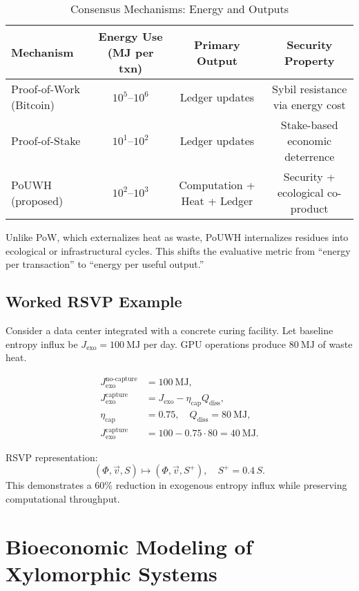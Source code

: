 \documentclass[12pt]{article}
\theoremstyle{plain}
\begin{document}
{{{{{{{{{{{{{{{{\begin{table}[h]
\centering
\caption{Consensus Mechanisms: Energy and Outputs}
\label{tab:consensus-compare}
\begin{tabular}{lccc}
\toprule
Mechanism & Energy Use (MJ per txn) & Primary Output & Security Property \\
\midrule
Proof-of-Work (Bitcoin) & $10^5$--$10^6$ & Ledger updates & Sybil resistance via energy cost \\
Proof-of-Stake & $10^1$--$10^2$ & Ledger updates & Stake-based economic deterrence \\
PoUWH (proposed) & $10^2$--$10^3$ & Computation + Heat + Ledger & Security + ecological co-product \\
\bottomrule
\end{tabular}
\end{table}

Unlike PoW, which externalizes heat as waste, PoUWH internalizes residues into ecological or infrastructural cycles. This shifts the evaluative metric from ``energy per transaction'' to ``energy per useful output.''

\subsection{Worked RSVP Example}
\label{sec:rsvp-example}

Consider a data center integrated with a concrete curing facility. Let baseline entropy influx be $J_{\text{exo}} = \SI{100}{\mega\joule}$ per day. GPU operations produce $\SI{80}{\mega\joule}$ of waste heat.

\begin{align*}
J_{\text{exo}}^{\text{no-capture}} &= \SI{100}{\mega\joule}, \\
J_{\text{exo}}^{\text{capture}} &= J_{\text{exo}} - \eta_{\text{cap}} Q_{\text{diss}}, \\
\eta_{\text{cap}} &= 0.75, \quad Q_{\text{diss}} = \SI{80}{\mega\joule}, \\
J_{\text{exo}}^{\text{capture}} &= 100 - 0.75 \cdot 80 = \SI{40}{\mega\joule}.
\end{align*}

RSVP representation:
\[
(\Phi, \vec v, S) \mapsto (\Phi, \vec v, S^{+}), \quad 
S^{+} = 0.4\,S.
\]
This demonstrates a 60\% reduction in exogenous entropy influx while preserving computational throughput.

\section{Bioeconomic Modeling of Xylomorphic Systems}
\label{sec:bioeconomic-modeling}

}}}}}}}}}}}}}}}}
\end{document}
